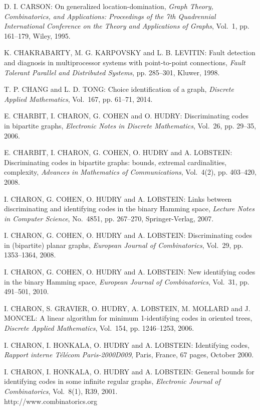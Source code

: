 \begin{thebibliography}{999}
D. I. CARSON: On generalized location-domination, {\it Graph Theory, Combinatorics, and Applications: Proceedings of the 7th Quadrennial International Conference on the Theory and Applications of Graphs}, Vol.~1, pp. 161--179, Wiley, 1995.

K. CHAKRABARTY, M. G. KARPOVSKY and L. B. LEVITIN: Fault detection and diagnosis in multiprocessor systems with point-to-point connections, {\it Fault Tolerant Parallel and Distributed Systems}, pp. 285--301, Kluwer, 1998.

T. P. CHANG and L. D. TONG: Choice identification of a graph, {\it Discrete Applied Mathematics}, Vol.~167, pp. 61--71, 2014.

E. CHARBIT, I. CHARON, G. COHEN and O. HUDRY: Discriminating codes in bipartite graphs, {\it Electronic Notes in Discrete Mathematics}, Vol.~26, pp. 29--35, 2006.

E. CHARBIT, I. CHARON, G. COHEN, O. HUDRY and A. LOBSTEIN: Discriminating codes in bipartite graphs: bounds, extremal cardinalities, complexity, {\it Advances in Mathematics of Communications}, Vol.~4(2), pp. 403--420, 2008.

I. CHARON, G. COHEN, O. HUDRY and A. LOBSTEIN: Links between discriminating and identifying codes in the binary Hamming space, {\it Lecture Notes in Computer Science}, No.~4851, pp. 267--270, Springer-Verlag, 2007.

I. CHARON, G. COHEN, O. HUDRY and A. LOBSTEIN: Discriminating codes in (bipartite) planar graphs, {\it European Journal of Combinatorics}, Vol.~29, pp. 1353--1364, 2008.

I. CHARON, G. COHEN, O. HUDRY and A. LOBSTEIN: New identifying codes in the binary Hamming space, {\it European Journal of Combinatorics}, Vol.~31, pp. 491--501, 2010.

I. CHARON, S. GRAVIER, O. HUDRY, A. LOBSTEIN, M. MOLLARD and J. MONCEL: A linear algorithm for minimum 1-identifying codes in oriented trees, {\it Discrete Applied Mathematics}, Vol.~154, pp. 1246--1253, 2006.

I. CHARON, I. HONKALA, O. HUDRY and A. LOBSTEIN: Identifying codes, {\it Rapport interne T\'el\'ecom Paris-2000D009}, Paris, France, 67 pages, October 2000.

I. CHARON, I. HONKALA, O. HUDRY and A. LOBSTEIN: General bounds for identifying codes in some infinite regular graphs, {\it Electronic Journal of Combinatorics}, Vol.~8(1), R39, 2001.\\
http://www.combinatorics.org


\end{thebibliography}
